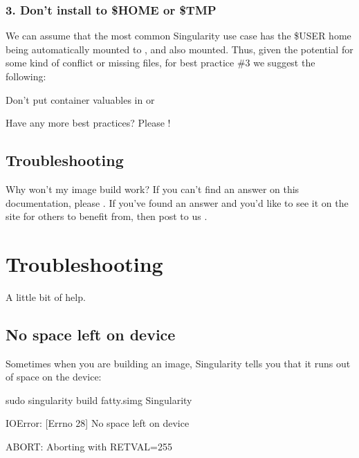 \documentclass[letterpaper,10pt,english]{sphinxmanual}
\begin{document}
\subsection{3. Don’t install to \$HOME or \$TMP}
\label{\detokenize{singularity_and_docker:don-t-install-to-home-or-tmp}}
We can assume that the most common Singularity use case has the \$USER
home being automatically mounted to , and  also mounted. Thus, given
the potential for some kind of conflict or missing files, for best
practice \#3 we suggest the following:

Don’t put container valuables in  or 

Have any more best practices? Please !


\section{Troubleshooting}
\label{\detokenize{singularity_and_docker:troubleshooting}}
Why won’t my image build work? If you can’t find an answer on this documentation,
please . If you’ve found an answer and you’d like to
see it on the site for others to benefit from, then post to us
.


\chapter{Troubleshooting}
\label{\detokenize{troubleshooting:troubleshooting}}\label{\detokenize{troubleshooting::doc}}
A little bit of help.


\section{No space left on device}
\label{\detokenize{troubleshooting:no-space-left-on-device}}
Sometimes when you are building an image, Singularity tells you that
it runs out of space on the device:

%
\begin{sphinxVerbatim}[commandchars=\\\{\}]
sudo singularity build fatty.simg Singularity

IOError: [Errno 28] No space left on device

ABORT: Aborting with RETVAL=255
\end{sphinxVerbatim}
\end{document}
